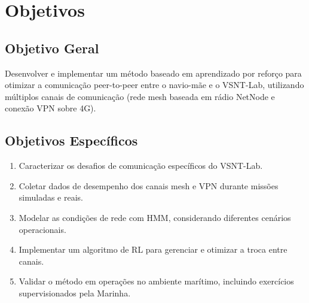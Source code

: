 \section{Objetivos}

\subsection{Objetivo Geral}
Desenvolver e implementar um método baseado em aprendizado por reforço para otimizar a comunicação peer-to-peer entre o navio-mãe e o VSNT-Lab, utilizando múltiplos canais de comunicação (rede mesh baseada em rádio NetNode e conexão VPN sobre 4G).

\subsection{Objetivos Específicos}
\begin{enumerate}
    \item Caracterizar os desafios de comunicação específicos do VSNT-Lab.
    \item Coletar dados de desempenho dos canais mesh e VPN durante missões simuladas e reais.
    \item Modelar as condições de rede com HMM, considerando diferentes cenários operacionais.
    \item Implementar um algoritmo de RL para gerenciar e otimizar a troca entre canais.
    \item Validar o método em operações no ambiente marítimo, incluindo exercícios supervisionados pela Marinha.
\end{enumerate}